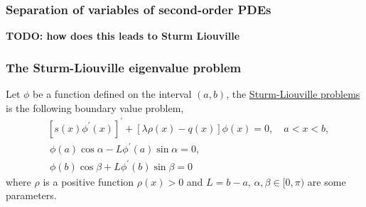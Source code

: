




\subsubsection{Separation of variables of second-order PDEs}

\textbf{TODO: how does this leads to Sturm Liouville}

\subsubsection{The Sturm-Liouville eigenvalue problem}\label{sec.Sturm_Liouville}

\begin{definition}
Let $\phi$ be a function defined on the interval $(a, b)$, the \underline{Sturm-Liouville problems} is the following boundary value problem,
\begin{equation}\label{eq.Sturm_Liouville}
    \begin{split}
        &\left[s(x) \phi^{\prime}(x)\right]^{\prime}+[\lambda \rho(x)-q(x)] \phi(x)=0, \quad a<x<b,
        \\
        &\ \phi(a) \cos \alpha-L \phi^{\prime}(a) \sin \alpha=0,
        \\
        &\ \phi(b) \cos \beta+L \phi^{\prime}(b) \sin \beta=0
    \end{split}
\end{equation}
where $\rho$ is a positive function $\rho(x)>0$ and $L=b-a$, $\alpha, \beta \in[0, \pi)$ are some parameters. 
\end{definition}

